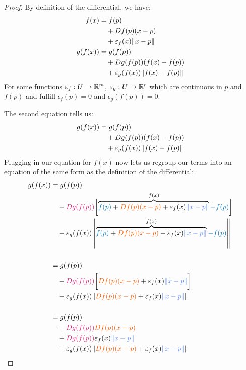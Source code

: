 \begin{proof}
	By definition of the differential, we have:
	\begin{align*}
		f(x) 
		&= f(p)\\
		&\quad+ 
		Df(p)(x-p)\\
		&\quad+ 
		\varepsilon_f(x)\norm{x - p}\\
		g(f(x))
		&=
		g(f(p))\\
		&\quad+
		Dg(f(p))(f(x)-f(p))\\
		&\quad+
		\varepsilon_g(f(x))\norm{f(x) - f(p)}
	\end{align*}
	For some functions $\varepsilon_f : U \to \mathbb{R}^m$, $\varepsilon_g : U \to \mathbb{R}^r$ which are continuous in $p$ and $f(p)$ and fulfill $\epsilon_f(p) = 0$ and $\epsilon_g(f(p)) = 0$. 
	
	The second equation tells us:
	\begin{align*}
		g(f(x))
		&=
		g(f(p))\\
		&\quad+
		Dg(f(p))(f(x) - f(p))\\
		&\quad+ \varepsilon_g(f(x))\norm{f(x) - f(p)}
	\end{align*}
	Plugging in our equation for $f(x)$ now lets us regroup our terms into an equation of the same form as the definition of the differential:
	\begin{align*}
		g(f(x))
		&=
		g(f(p))\\
		&\+
		\tc{c3}{Dg(f(p))}
		\biggl[
			\overbrace{
			\tc{c2}{f(p)}
			+ 
			\tc{c4}{Df(p)(x-p)}
			+ 
			\epsilon_f(x)\tc{c1}{\norm{x - p}}}^{f(x)} \tc{c2}{- f(p)}
		\biggr]
		\\
		&\+ 
		\epsilon_g(f(x))
		\norm{
			\overbrace{\tc{c2}{f(p)}
			+ 
			\tc{c4}{Df(p)(x-p)}
			+ 
			\epsilon_f(x)\tc{c1}{\norm{x - p}}}^{f(x)} \tc{c2}{- f(p)}
		}
		\\
	\\
		&=
		g(f(p))\\
		&\+
		\tc{c3}{Dg(f(p))}
		\biggl[
			\tc{c4}{Df(p)(x-p)}
			+ 
			\epsilon_f(x)\tc{c1}{\norm{x - p}}
		\biggr]
		\\
		&\+ 
		\epsilon_g(f(x))
		\norm{
			\tc{c4}{Df(p)(x-p)}
			+ 
			\epsilon_f(x)\tc{c1}{\norm{x - p}}
		}
		\\
	\\
		&=
		g(f(p))\\
		&\+
		\tc{c3}{Dg(f(p))}\tc{c4}{Df(p)(x-p)}\\
		&\+ 
		\tc{c3}{Dg(f(p))}\epsilon_f(x)\tc{c1}{\norm{x - p}}
		\\
		&\+ 
		\epsilon_g(f(x))
		\norm{
			\tc{c4}{Df(p)(x-p)}
			+ 
			\epsilon_f(x)\tc{c1}{\norm{x - p}}
}
\end{align*}
\end{proof}
